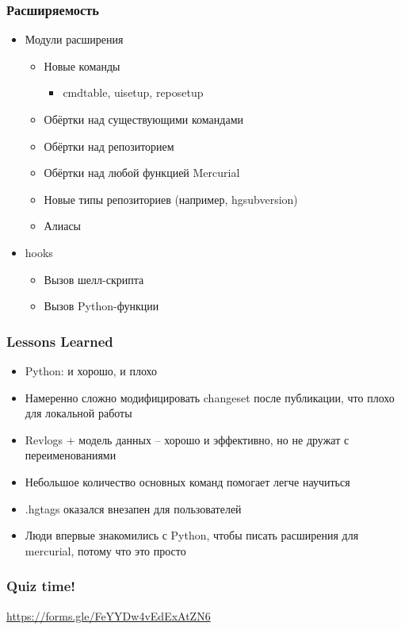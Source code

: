 \documentclass[xetex,mathserif,serif]{beamer}
\begin{document}
	\begin{frame}
		\frametitle{Расширяемость}
		\begin{itemize}
			\item Модули расширения
			\begin{itemize}
				\item Новые команды
				\begin{itemize}
					\item cmdtable, uisetup, reposetup
				\end{itemize}
				\item Обёртки над существующими командами
				\item Обёртки над репозиторием
				\item Обёртки над любой функцией Mercurial
				\item Новые типы репозиториев (например, hgsubversion)
				\item Алиасы
			\end{itemize}
			\item hooks
			\begin{itemize}
				\item Вызов шелл-скрипта
				\item Вызов Python-функции
			\end{itemize}
		\end{itemize}
	\end{frame}

	\begin{frame}
		\frametitle{Lessons Learned}
		\begin{itemize}
			\item Python: и хорошо, и плохо
			\item Намеренно сложно модифицировать changeset после публикации, что плохо для локальной работы
			\item Revlogs + модель данных -- хорошо и эффективно, но не дружат с переименованиями
			\item Небольшое количество основных команд помогает легче научиться
			\item .hgtags оказался внезапен для пользователей
			\item Люди впервые знакомились с Python, чтобы писать расширения для mercurial, потому что это просто
		\end{itemize}
	\end{frame}

	\begin{frame}
		\frametitle{Quiz time!}
		\begin{center}
			\url{https://forms.gle/FeYYDw4vEdExAtZN6}
		\end{center}
	\end{frame}
\end{document}
